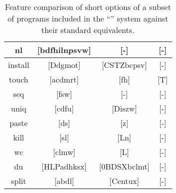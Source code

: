\begin{table}[H]
\begin{center}
\begin{tabular}{|c|c|c|c|}
            \hline
            nl & [bdfhilnpsvw] & [-] & [-] \\
            \hline
            install & [Ddgmot] & [CSTZbcpsv] & [-] \\
            \hline
            touch & [acdmrt] & [fh] & [T] \\
            \hline
            seq & [fsw] & [-] & [-] \\
            \hline
            uniq & [cdfu] & [Diszw] & [-] \\
            \hline
            paste & [ds] & [z] & [-] \\
            \hline
            kill & [sl] & [Ln] & [-] \\ 
            \hline
            wc & [clmw] & [L] & [-] \\
            \hline
            du & [HLPadhksx] & [0BDSXbclmt] & [-] \\
            \hline
            split & [abdl] & [Centux] & [-] \\
            \hline
        \end{tabular}
    \end{center}
    \caption{Feature comparison of short options of a subset of programs included in the \enquote{} system against their standard equivalents.}
\end{table}
